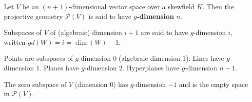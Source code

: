 Let $V$ be an $(n+1)$-dimensional vector space over a skewfield $K$. Then the projective geometry $\mathcal{P}(V)$ is said to have \textbf{$g$-dimension} $n$.

Subspaces of $V$ of (algebraic) dimension $i+1$ are said to have $g$-dimension $i$, written $gd(W) = i = \dim(W) - 1$.

Points are subspaces of $g$-dimension $0$ (algebraic dimension $1$). Lines have $g$-dimension $1$. Planes have $g$-dimension $2$. Hyperplanes have $g$-dimension $n-1$.

The zero subspace of $V$ (dimension $0$) has $g$-dimension $-1$ and is the empty space in $\mathcal{P}(V)$.
